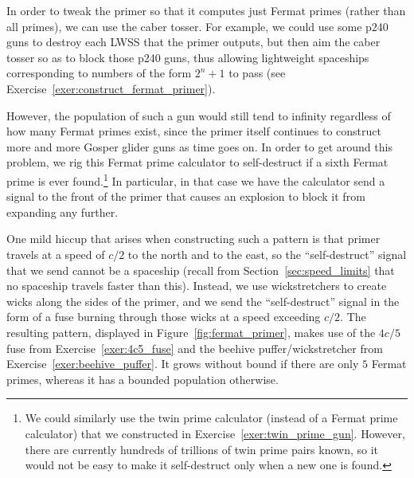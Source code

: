 In order to tweak the primer so that it computes just Fermat primes (rather than all primes), we can use the caber tosser. For example, we could use some p240 guns to destroy each LWSS that the primer outputs, but then aim the caber tosser so as to block those p240 guns, thus allowing lightweight spaceships corresponding to numbers of the form $2^n+1$ to pass (see Exercise~\ref{exer:construct_fermat_primer}).

However, the population of such a gun would still tend to infinity regardless of how many Fermat primes exist, since the primer itself continues to construct more and more Gosper glider guns as time goes on. In order to get around this problem, we rig this Fermat prime calculator to self-destruct if a sixth Fermat prime is ever found.\footnote{We could similarly use the twin prime calculator (instead of a Fermat prime calculator) that we constructed in Exercise~\ref{exer:twin_prime_gun}. However, there are currently hundreds of trillions of twin prime pairs known, so it would not be easy to make it self-destruct only when a new one is found.} In particular, in that case we have the calculator send a signal to the front of the primer that causes an explosion to block it from expanding any further.

One mild hiccup that arises when constructing such a pattern is that primer travels at a speed of $c/2$ to the north and to the east, so the ``self-destruct'' signal that we send cannot be a spaceship (recall from Section~\ref{sec:speed_limits} that no spaceship travels faster than this). Instead, we use wickstretchers to create wicks along the sides of the primer, and we send the ``self-destruct'' signal in the form of a fuse burning through those wicks at a speed exceeding $c/2$. The resulting pattern, displayed in Figure~\ref{fig:fermat_primer}, makes use of the $4c/5$ fuse from Exercise~\ref{exer:4c5_fuse} and the beehive puffer/wickstretcher from Exercise~\ref{exer:beehive_puffer}. It grows without bound if there are only $5$ Fermat primes, whereas it has a bounded population otherwise.


